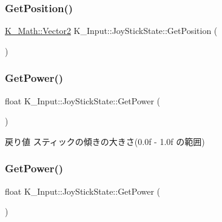 \subsubsection{\texorpdfstring{Get\+Position()}{GetPosition()}\hspace{0.1cm}{\footnotesize\ttfamily [2/2]}}
{\footnotesize\ttfamily \mbox{\hyperlink{namespace_k___math_a41eb0c2c69c938cd59989eb3241cefb2}{K\+\_\+\+Math\+::\+Vector2}} K\+\_\+\+Input\+::\+Joy\+Stick\+State\+::\+Get\+Position (\begin{DoxyParamCaption}{ }\end{DoxyParamCaption})\hspace{0.3cm}{\ttfamily [inline]}}

\mbox{\label{struct_k___input_1_1_joy_stick_state_a776fba0de2ecbfdec3636e857131d72e}} 
\subsubsection{\texorpdfstring{Get\+Power()}{GetPower()}\hspace{0.1cm}{\footnotesize\ttfamily [1/2]}}
{\footnotesize\ttfamily float K\+\_\+\+Input\+::\+Joy\+Stick\+State\+::\+Get\+Power (\begin{DoxyParamCaption}{ }\end{DoxyParamCaption})\hspace{0.3cm}{\ttfamily [inline]}}

\begin{DoxyReturn}{戻り値}
スティックの傾きの大きさ(0.\+0f -\/ 1.\+0f の範囲) 
\end{DoxyReturn}
\mbox{\label{struct_k___input_1_1_joy_stick_state_a776fba0de2ecbfdec3636e857131d72e}} 
\subsubsection{\texorpdfstring{Get\+Power()}{GetPower()}\hspace{0.1cm}{\footnotesize\ttfamily [2/2]}}
{\footnotesize\ttfamily float K\+\_\+\+Input\+::\+Joy\+Stick\+State\+::\+Get\+Power (\begin{DoxyParamCaption}{ }\end{DoxyParamCaption})\hspace{0.3cm}{\ttfamily [inline]}}

